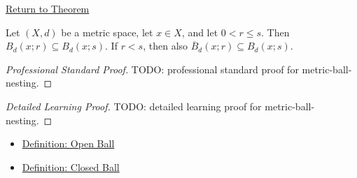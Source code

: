 \newpage
{}
\label{prf:metric-ball-nesting}

\begin{remark*}[Return]
\hyperref[thm:metric-ball-nesting]{Return to Theorem}
\end{remark*}

\begin{theorem*}
Let \((X,d)\) be a metric space, let \(x\in X\), and let \(0<r\leq s\).
Then \(B_d(x;r)\subseteq B_d(x;s)\).  If \(r<s\), then also
\(\overline{B}_d(x;r)\subseteq B_d(x;s)\).
\end{theorem*}

\begin{proof}[Professional Standard Proof]
\LRAProofBodyStart
TODO: professional standard proof for metric-ball-nesting.
\end{proof}

\begin{proof}[Detailed Learning Proof]
\LRAProofBodyStart
TODO: detailed learning proof for metric-ball-nesting.
\end{proof}

\begin{remark*}
\end{remark*}

\begin{dependencies}
\begin{itemize}
  \item \hyperref[def:metric-open-ball]{Definition: Open Ball}
  \item \hyperref[def:metric-closed-ball]{Definition: Closed Ball}
\end{itemize}
\end{dependencies}

\clearpage
